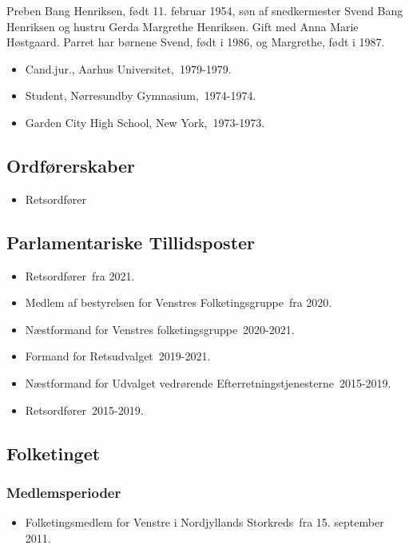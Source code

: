 \documentclass[11pt, a4paper]{awesome-cv}
\begin{document}
\makecvheader[R]
\makelettertitle
\begin{cvletter}
Preben Bang Henriksen, født 11. februar 1954, søn af snedkermester Svend Bang Henriksen og hustru Gerda Margrethe Henriksen. Gift med Anna Marie Høstgaard. Parret har børnene Svend, født i 1986, og Margrethe, født i 1987.

\begin{itemize}
\item Cand.jur., Aarhus Universitet, 1979-1979.
\item Student, Nørresundby Gymnasium, 1974-1974.
\item Garden City High School, New York, 1973-1973.
\end{itemize}
\subsection*{Ordførerskaber}
\begin{itemize}
\item Retsordfører
\end{itemize}
\subsection*{Parlamentariske Tillidsposter}
\begin{itemize}
\item Retsordfører fra 2021.
\item Medlem af bestyrelsen for Venstres Folketingsgruppe fra 2020.
\item Næstformand for Venstres folketingsgruppe 2020-2021.
\item Formand for Retsudvalget 2019-2021.
\item Næstformand for Udvalget vedrørende Efterretningstjenesterne 2015-2019.
\item Retsordfører 2015-2019.
\end{itemize}
\subsection*{Folketinget}
\subsubsection*{Medlemsperioder}
\begin{itemize}
\item Folketingsmedlem for Venstre i Nordjyllands Storkreds fra 15. september 2011.
\end{itemize}

\end{cvletter}
\end{document}
